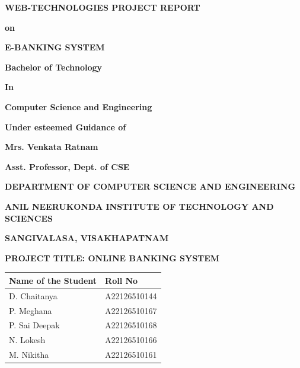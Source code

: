 \documentclass[12pt,a4paper]{report}
\begin{document}
\begin{titlepage}
    \centering
    \vspace*{1cm}
    {\huge\bfseries WEB-TECHNOLOGIES PROJECT REPORT\par}
    \vspace{1cm}
    {\Large\bfseries on\par}
    \vspace{1cm}
    {\huge\bfseries E-BANKING SYSTEM\par}
    \vspace{2cm}
    {\Large\bfseries Bachelor of Technology\par}
    \vspace{0.5cm}
    {\Large\bfseries In\par}
    \vspace{0.5cm}
    {\Large\bfseries Computer Science and Engineering\par}
    \vspace{2cm}
    {\Large\bfseries Under esteemed Guidance of\par}
    \vspace{0.5cm}
    {\Large\bfseries Mrs. Venkata Ratnam\par}
    \vspace{0.5cm}
    {\Large\bfseries Asst. Professor, Dept. of CSE\par}
    \vspace{2cm}
    {\Large\bfseries DEPARTMENT OF COMPUTER SCIENCE AND ENGINEERING\par}
    \vspace{0.5cm}
    {\Large\bfseries ANIL NEERUKONDA INSTITUTE OF TECHNOLOGY AND SCIENCES\par}
    \vspace{0.5cm}
    {\Large\bfseries SANGIVALASA, VISAKHAPATNAM\par}
\end{titlepage}

\thispagestyle{empty}
\begin{center}
    \LARGE\textbf{PROJECT TITLE: ONLINE BANKING SYSTEM}\\
    \vspace{2cm}

    \begin{tabular}{|l|l|}
        \hline
        \textbf{Name of the Student} & \textbf{Roll No} \\
        \hline
        D. Chaitanya & A22126510144 \\
        \hline
        P. Meghana & A22126510167 \\
        \hline
        P. Sai Deepak & A22126510168 \\
        \hline
        N. Lokesh & A22126510166 \\
        \hline
        M. Nikitha & A22126510161 \\
        \hline
    \end{tabular}
\end{center}
\newpage
\end{document}
